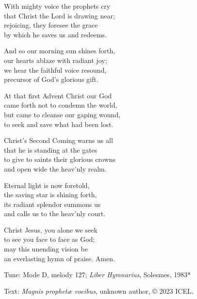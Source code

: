\hymn

\settowidth{\versewidth}{to give to saints their glorious crowns}

\begin{hymnverse}[\versewidth]
With mighty voice the prophets cry\\
that Christ the Lord is drawing near;\\
rejoicing, they foresee the grace\\
by which he saves us and redeems.

And so our morning sun shines forth,\\
our hearts ablaze with radiant joy;\\
we hear the faithful voice resound,\\
precursor of God’s glorious gift.

At that first Advent Christ our God\\
came forth not to condemn the world,\\
but came to cleanse our gaping wound,\\
to seek and save what had been lost.

Christ’s Second Coming warns us all\\
that he is standing at the gates\\
to give to saints their glorious crowns\\
and open wide the heav’nly realm.

Eternal light is now foretold,\\
the saving star is shining forth,\\
its radiant splendor summons us\\
and calls us to the heav’nly court.

Christ Jesus, you alone we seek\\
to see you face to face as God;\\
may this unending vision be\\
an everlasting hymn of praise. Amen.
\end{hymnverse}

\begin{hymnsource}
Tune: Mode D, melody 127; \emph{Liber Hymnarius}, Solesmes, 1983*

Text: \emph{Magnis prophetæ vocibus}, unknown author, © 2023 ICEL.
\end{hymnsource}